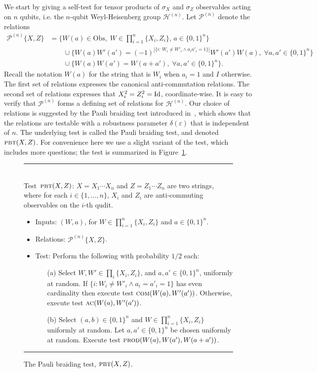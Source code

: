 \documentclass[11pt]{article}
\theoremstyle{remark}
\theoremstyle{definition}
\newcommand{\Id}{\ensuremath{\mathop{\rm Id}\nolimits}}
\newcommand{\setft}[1]{\mathrm{#1}}
\newcommand{\Obs}{\setft{Obs}}
\newcommand{\eps}{\varepsilon}
\newcommand{\pbt}{\textsc{pbt}}
\newcommand{\prodt}{\textsc{prod}}
\newcommand{\comt}{\textsc{com}}
\newcommand{\act}{\textsc{ac}}
\newcommand{\heisgn}{{\mathcal{H}^{(n)}}}
\newcommand{\paulin}{\mathcal{P}^{(n)}\!}
\begin{document}
We start by giving a self-test for tensor products of $\sigma_X$ and $\sigma_Z$ 
observables acting on $n$ qubits, i.e. the $n$-qubit Weyl-Heisenberg group $\heisgn$. 
Let $\mathcal{P}^{(n)}$ denote the relations  
\begin{align*}
\paulin\{X,Z\} &= \Big\{ W(a)\in\Obs,\;W \in \prod_{i=1}^n \{X_i,Z_i\},\,a\in\{0,1\}^n\Big\} \\
&\qquad\cup \Big\{W(a)W'(a')=(-1)^{|\{i:\,W_i\neq W'_i \wedge a_ia'_i=1\}|} W'(a')W(a),\;\forall a,a'\in\{0,1\}^n\Big\}\\
&\qquad \cup\Big\{ W(a)W(a')=W(a+a'),\;\forall a,a'\in\{0,1\}^n\Big\}.
\end{align*}
Recall the notation $W(a)$ for the string that is $W_i$ when $a_i=1$ and $I$ otherwise. 
The first set of relations expresses the canonical anti-commutation relations. The second set of relations expresses that $X_i^2=Z_i^2=\Id$, coordinate-wise. It is easy to verify that $\mathcal{P}^{(n)}$ forms a defining set of relations for $\heisgn$. Our choice of relations is suggested by the Pauli braiding test introduced in~\cite{natarajan2016robust}, which shows that the relations are testable with a robustness parameter $\delta(\eps)$ that is independent of $n$. 
The underlying test is called the Pauli braiding test, and denoted $\pbt(X,Z)$. For convenience here we use a slight variant of the test, which includes more questions; the test is summarized in Figure~\ref{fig:pbt}. 

\begin{figure}[H]
\rule[1ex]{16.5cm}{0.5pt}\\
Test~$\pbt(X,Z)$: $X=X_1\cdots X_n$ and $Z=Z_1\cdots Z_n$ are two strings, where for each $i\in\{1,\ldots,n\}$, $X_i$ and $Z_i$ are anti-commuting observables on the $i$-th qudit. 
\begin{itemize}
\item Inputs: $(W,a)$, for $W\in\prod_{i=1}^n\{X_i,Z_i\}$ and $a\in\{0,1\}^n$.
\item Relations: $\paulin\{X,Z\}$.  
\item Test: Perform the following with probability $1/2$ each: 
\begin{enumerate}
\item[(a)] Select $W,W'\in \prod_i \{X_i,Z_i\}$, and $a,a'\in\{0,1\}^n$, uniformly at random. If $\{i: W_i\neq W'_i \wedge a_i=a'_i=1\}$ has even cardinality then execute test $\comt(W(a),W'(a'))$. Otherwise, execute test $\act(W(a),W'(a'))$. 
\item[(b)] Select $(a,b)\in\{0,1\}^n$ and $W\in\prod_{i=1}^n\{X_i,Z_i\}$ uniformly at random. Let $a,a'\in\{0,1\}^n$ be chosen uniformly at random. Execute test $\prodt(W(a),W(a'),W(a+a'))$. 
\end{enumerate}
\end{itemize}
\rule[2ex]{16.5cm}{0.5pt}\vspace{-1cm}
\caption{The Pauli braiding test, $\pbt(X,Z)$.}
\label{fig:pbt}
\end{figure}
\end{document}
